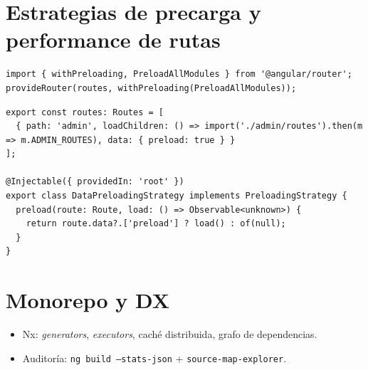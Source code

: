 \documentclass[11pt,a4paper]{article}
\begin{document}
\section{Estrategias de precarga y performance de rutas}
\begin{lstlisting}[style=tsstyle, caption={PreloadAllModules y precarga personalizada}]
import { withPreloading, PreloadAllModules } from '@angular/router';
provideRouter(routes, withPreloading(PreloadAllModules));
\end{lstlisting}

\begin{lstlisting}[style=tsstyle, caption={Precarga condicional por data}]
export const routes: Routes = [
  { path: 'admin', loadChildren: () => import('./admin/routes').then(m => m.ADMIN_ROUTES), data: { preload: true } }
];

@Injectable({ providedIn: 'root' })
export class DataPreloadingStrategy implements PreloadingStrategy {
  preload(route: Route, load: () => Observable<unknown>) {
    return route.data?.['preload'] ? load() : of(null);
  }
}
\end{lstlisting}

\section{Monorepo y DX}
\begin{itemize}[leftmargin=*]
  \item Nx: \emph{generators}, \emph{executors}, caché distribuida, grafo de dependencias.
  \item Auditoría: \texttt{ng build --stats-json} + \texttt{source-map-explorer}.
\end{itemize}
\end{document}
